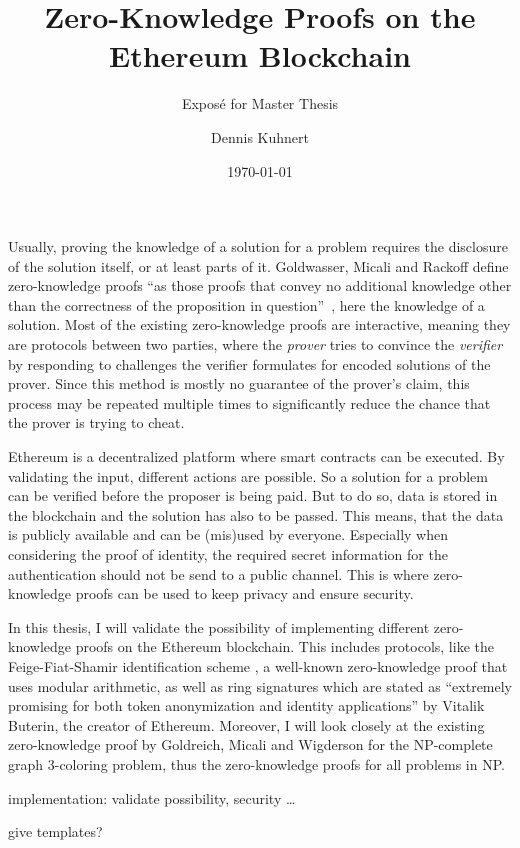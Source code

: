 \documentclass[a4paper,parskip=half]{scrartcl}
\title{Zero-Knowledge Proofs on the Ethereum Blockchain}
\subtitle{Exposé for Master Thesis}
\author{Dennis Kuhnert}
\date{\today}
\begin{document}
\maketitle

Usually, proving the knowledge of a solution for a problem requires the disclosure of the solution itself, or at least parts of it.
Goldwasser, Micali and Rackoff define zero-knowledge proofs ``as those proofs that convey no additional knowledge other than the correctness of the proposition in question''~\cite{goldwasser1989knowledge}, here the knowledge of a solution.
Most of the existing zero-knowledge proofs are interactive, meaning they are protocols between two parties, where the \emph{prover} tries to convince the \emph{verifier} by responding to challenges the verifier formulates for encoded solutions of the prover.
Since this method is mostly no guarantee of the prover's claim, this process may be repeated multiple times to significantly reduce the chance that the prover is trying to cheat.

Ethereum is a decentralized platform where smart contracts can be executed.
By validating the input, different actions are possible.
So a solution for a problem can be verified before the proposer is being paid.
But to do so, data is stored in the blockchain and the solution has also to be passed.
This means, that the data is publicly available and can be (mis)used by everyone.
Especially when considering the proof of identity, the required secret information for the authentication should not be send to a public channel.
This is where zero-knowledge proofs can be used to keep privacy and ensure security.

In this thesis, I will validate the possibility of implementing different zero-knowledge proofs on the Ethereum blockchain.
This includes protocols, like the Feige-Fiat-Shamir identification scheme \cite{feige1988zero}, a well-known zero-knowledge proof that uses modular arithmetic, as well as 
ring signatures which are stated as ``extremely promising for both token anonymization and identity applications'' \cite{buterin2015public} by Vitalik Buterin, the creator of Ethereum.
Moreover, I will look closely at the existing zero-knowledge proof by Goldreich, Micali and Wigderson \cite{goldreich1991proofs} for the NP-complete graph 3-coloring problem, thus the zero-knowledge proofs for all problems in NP.

implementation: validate possibility, security \dots

give templates?
\end{document}
